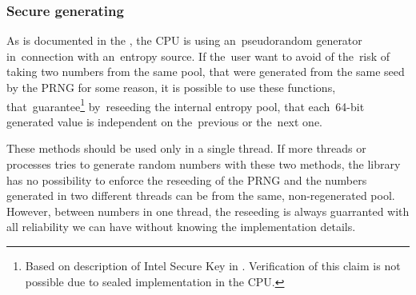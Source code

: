 \\

\\

\\

\\

\\

\subsubsection{Secure generating}\label{subsec:api:secure}
As is documented in the , the CPU is using an~pseudorandom generator in~connection with an~entropy source. If the~user want to avoid of the~risk of taking two numbers from the same pool, that were generated from the same seed by the PRNG for some reason, it is possible to use these functions, that~guarantee\footnote{Based on description of Intel Secure Key in . Verification of this claim is not possible due to sealed implementation in the CPU.} by~reseeding the internal entropy pool, that each~64-bit generated value is independent on the~previous or the~next one. 

These methods should be used only in a single thread. If more threads or processes tries to generate random numbers with these two methods, the library has no possibility to enforce the reseeding of the PRNG and the numbers generated in two different threads can be from the same, non-regenerated pool. However, between numbers in one thread, the reseeding is always guarranted with all reliability we can have without knowing the implementation details. \\




